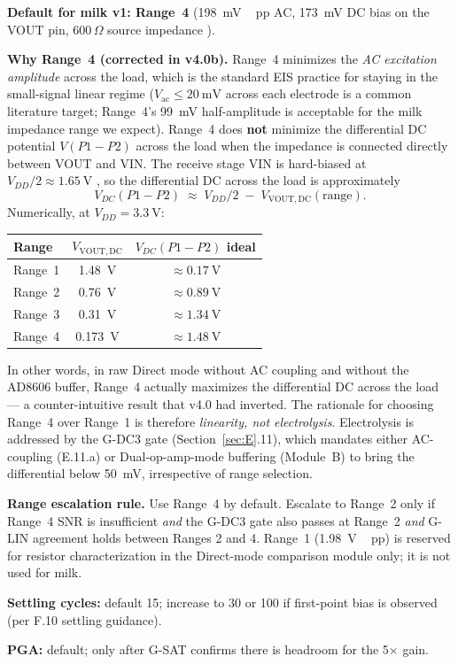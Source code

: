 \documentclass[11pt,a4paper]{article}
\newcommand{\Rohm}[1]{\ensuremath{#1\,\Omega}}
\begin{document}
\begin{rulebox}
\textbf{Default for milk v1: Range~4} (\SI{198}{\milli\volt\,pp} AC, \SI{173}{\milli\volt} DC bias on the VOUT pin, \Rohm{600} source impedance \cite{ad5933ds}).

\textbf{Why Range~4 (corrected in v4.0b).} Range~4 minimizes the \emph{AC excitation amplitude} across the load, which is the standard EIS practice for staying in the small-signal linear regime ($V_\mathrm{ac}\!\leq\!\SI{20}{\milli\volt}$ across each electrode is a common literature target; Range~4's \SI{99}{\milli\volt} half-amplitude is acceptable for the milk impedance range we expect). Range~4 does \textbf{not} minimize the differential DC potential $V(P1\!-\!P2)$ across the load when the impedance is connected directly between VOUT and VIN. The receive stage VIN is hard-biased at $V_{DD}/2 \approx \SI{1.65}{\volt}$ \cite{ad5933ds}, so the differential DC across the load is approximately
\[
V_{DC}(P1\!-\!P2) \;\approx\; V_{DD}/2 \;-\; V_\mathrm{VOUT,DC}(\mathrm{range}).
\]
Numerically, at $V_{DD}=\SI{3.3}{\volt}$:

\begin{tabular}{lcc}
\toprule
\textbf{Range} & \textbf{$V_\mathrm{VOUT,DC}$} & \textbf{$V_{DC}(P1\!-\!P2)$ ideal} \\
\midrule
Range~1 & \SI{1.48}{\volt} & $\approx\SI{0.17}{\volt}$ \\
Range~2 & \SI{0.76}{\volt} & $\approx\SI{0.89}{\volt}$ \\
Range~3 & \SI{0.31}{\volt} & $\approx\SI{1.34}{\volt}$ \\
Range~4 & \SI{0.173}{\volt} & $\approx\SI{1.48}{\volt}$ \\
\bottomrule
\end{tabular}

In other words, in raw Direct mode without AC coupling and without the AD8606 buffer, Range~4 actually maximizes the differential DC across the load --- a counter-intuitive result that v4.0 had inverted. The rationale for choosing Range~4 over Range~1 is therefore \emph{linearity, not electrolysis}. Electrolysis is addressed by the G-DC3 gate (Section~\ref{sec:E}.11), which mandates either AC-coupling (E.11.a) or Dual-op-amp-mode buffering (Module~B) to bring the differential below \SI{50}{\milli\volt}, irrespective of range selection.

\textbf{Range escalation rule.} Use Range~4 by default. Escalate to Range~2 only if Range~4 SNR is insufficient \emph{and} the G-DC3 gate also passes at Range~2 \emph{and} G-LIN agreement holds between Ranges 2 and 4. Range~1 (\SI{1.98}{\volt\,pp}) is reserved for resistor characterization in the Direct-mode comparison module only; it is not used for milk.

\textbf{Settling cycles:} default 15; increase to 30 or 100 if first-point bias is observed (per F.10 settling guidance).

\textbf{PGA:}  default;  only after G-SAT confirms there is headroom for the 5$\times$ gain.
\end{rulebox}
\end{document}
